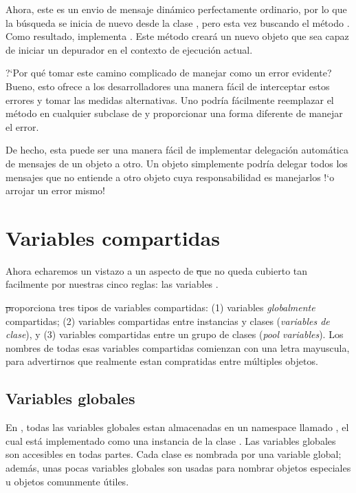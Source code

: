 \documentclass[a4paper,10pt,twoside]{book}
\begin{document}
Ahora, este es un envio de mensaje din\'amico perfectamente ordinario, por lo que la b\'usqueda se inicia de nuevo desde la clase , pero esta vez buscando el m\'etodo .
Como resultado,  implementa .
Este m\'etodo crear\'a un nuevo objeto  que sea capaz de iniciar un depurador en el contexto de ejecuci\'on actual.

?`Por qu\'e tomar este camino complicado de manejar como un error evidente?
Bueno, esto ofrece a los desarrolladores una manera f\'acil de interceptar estos errores y tomar las medidas alternativas.
Uno podr\'ia f\'acilmente reemplazar el m\'etodo  en cualquier subclase de  y proporcionar una forma diferente de manejar el error.

De hecho, esta puede ser una manera f\'acil de implementar delegaci\'on autom\'atica de mensajes de un objeto a otro.
Un objeto  simplemente podr\'ia delegar todos los mensajes que no entiende a otro objeto cuya responsabilidad es manejarlos !`o arrojar un error mismo!

\section{Variables compartidas}

Ahora echaremos un vistazo a un aspecto de \st que no queda cubierto tan facilmente por nuestras cinco reglas: las variables .

\st proporciona tres tipos de variables compartidas: (1) variables \emph{globalmente} compartidas; (2) variables compartidas entre instancias y clases (\emph{variables de clase}), y (3) variables compartidas entre un grupo de clases (\emph{pool variables}).  Los nombres de todas esas variables compartidas comienzan con una letra mayuscula, para advertirnos que realmente estan compratidas entre m\'ultiples objetos.

\subsection{Variables globales}
En \pharo, todas las variables globales estan almacenadas en un namespace llamado , el cual est\'a implementado como una instancia de la clase .
Las variables globales son accesibles en todas partes. 
Cada clase es nombrada por una variable global; adem\'as, unas pocas variables globales son usadas para nombrar objetos especiales u objetos comunmente \'utiles.
\end{document}
